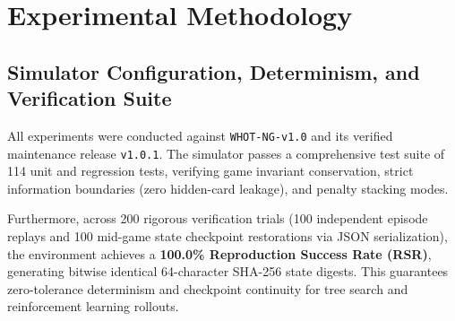 \documentclass[11pt]{article}
\begin{document}
\section{Experimental Methodology}

\subsection{Simulator Configuration, Determinism, and Verification Suite}
All experiments were conducted against \texttt{WHOT-NG-v1.0} and its verified maintenance release \texttt{v1.0.1}. The simulator passes a comprehensive test suite of 114 unit and regression tests, verifying game invariant conservation, strict information boundaries (zero hidden-card leakage), and penalty stacking modes.

Furthermore, across 200 rigorous verification trials (100 independent episode replays and 100 mid-game state checkpoint restorations via JSON serialization), the environment achieves a \textbf{100.0\% Reproduction Success Rate (RSR)}, generating bitwise identical 64-character SHA-256 state digests. This guarantees zero-tolerance determinism and checkpoint continuity for tree search and reinforcement learning rollouts.
\end{document}
